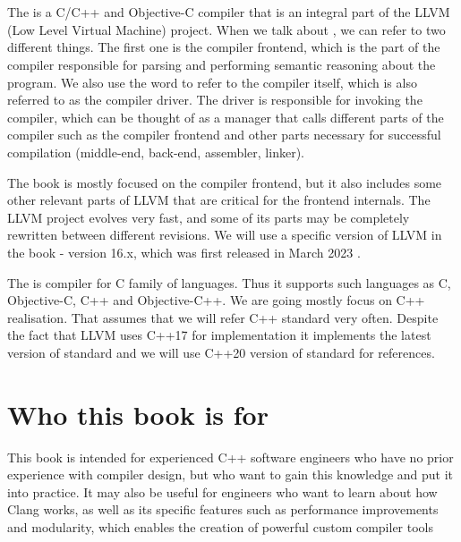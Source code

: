 \pagestyle{fancy}
\nopagecolor
\fancyhf{}
\rhead{\thepage}

\begin{FlushLeft}

\section*{}
\label{sec:preface}
The \clang is a C/C++ and Objective-C compiler that is an integral part of the
LLVM (Low Level Virtual Machine) project. When we talk about \clang, we can refer to two different
things. The first one is the compiler frontend, which is the part of the
compiler responsible for parsing and performing semantic reasoning about the
program. We also use the word \clang to refer to the compiler itself, which is
also referred to as the compiler driver. The driver is responsible for invoking
the compiler, which can be thought of as a manager that calls different parts of
the compiler such as the compiler frontend and other parts necessary for
successful compilation (middle-end, back-end, assembler, linker). 

The book is mostly focused on the \clang compiler frontend, but it also includes
some other relevant parts of LLVM that are critical for the frontend
internals. The LLVM project evolves very fast, and some of its parts may be
completely rewritten between different revisions. We will use a specific version
of LLVM in the book - version 16.x, which was first released in March 2023
\citep{llvm:releases}. 

The \clang is compiler for C family of languages. Thus it supports such
languages as C, Objective-C, C++ and Objective-C++. We are going mostly focus on
C++ realisation. That assumes that we will refer C++ standard very
often. Despite the fact that LLVM uses C++17 \citep{standard:cpp17}for
implementation it implements the latest version of standard and we will use
C++20 version of standard \citep{standard:cpp20} for references.

\section*{Who this book is for}
This book is intended for experienced C++ software engineers who have no prior
experience with compiler design, but who want to gain this knowledge and put it
into practice. It may also be useful for engineers who want to learn about how
Clang works, as well as its specific features such as performance improvements
and modularity, which enables the creation of powerful custom compiler tools 


\end{FlushLeft}
